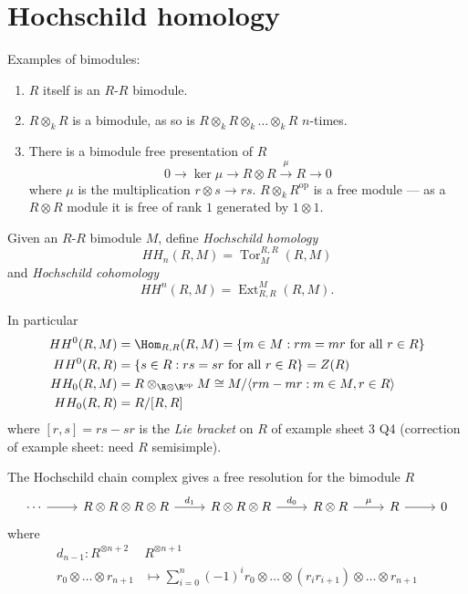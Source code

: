\documentclass[a4paper]{article}
\DeclareMathOperator{\Tor}{Tor}
\DeclareMathOperator{\Ext}{Ext}
\begin{document}
\section{Hochschild homology}

\begin{eg}
  Examples of bimodules:
  \begin{enumerate}
  \item \(R\) itself is an \(R\)-\(R\) bimodule.
  \item \(R \otimes_k R\) is a bimodule, as so is \(R \otimes_k R \otimes_k \dots \otimes_k R\) \(n\)-times.
  \item There is a bimodule free presentation of \(R\)
    \[
      0 \to \ker \mu \to R \otimes R \xrightarrow{\mu} R \to 0
    \]
    where \(\mu\) is the multiplication \(r \otimes s \to rs\). \(R \otimes_k R^{\text{op}}\) is a free module --- as a \(R \otimes R\) module it is free of rank \(1\) generated by \(1 \otimes 1\).
  \end{enumerate}
\end{eg}

\begin{definition}
  Given an \(R\)-\(R\) bimodule \(M\), define \emph{Hochschild homology}
  \[
    HH_n(R, M) = \Tor_M^{R, R} (R, M)
  \]
  and \emph{Hochschild cohomology}
  \[
    HH^n(R, M) = \Ext_{R, R}^M(R, M).
  \]
\end{definition}

In particular
\begin{align*}
  HH^0(R, M) &= \Hom_{R, R} (R, M) = \{m \in M: rm = mr \text{ for all } r \in R\} \\
  HH^0(R, R) &= \{s \in R: rs = sr \text{ for all } r \in R\} = Z(R) \\
  HH_0(R, M) &= R \otimes_{\R \otimes \R^{\text{op}}} M \cong M / \langle rm - mr: m \in M, r \in R \rangle \\
  HH_0(R, R) &= R/[R, R]
\end{align*}
where \([r, s] = rs - sr\) is the \emph{Lie bracket} on \(R\) of example sheet 3 Q4 (correction of example sheet: need \(R\) semisimple).

\begin{definition}
  The Hochschild chain complex gives a free resolution for the bimodule \(R\)
  \[
    \begin{tikzcd}
      \cdots \ar[r] & R \otimes R \otimes R \otimes R \ar[r, "d_1"] & R \otimes R \otimes R \ar[r, "d_0"] & R \otimes R \ar[r, "\mu"] & R \ar[r] & 0
    \end{tikzcd}
  \]
  where
  \begin{align*}
    d_{n - 1}: R^{\otimes n + 2} & R^{\otimes n + 1} \\
    r_0 \otimes \dots \otimes r_{n + 1} &\mapsto \sum_{i = 0}^n (-1)^i r_0 \otimes \dots \otimes (r_ir_{i + 1}) \otimes \dots \otimes r_{n + 1}
  \end{align*}
\end{definition}
\end{document}
